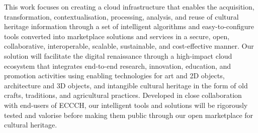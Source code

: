 This work focuses on creating a cloud infrastructure that enables the acquisition, transformation, contextualisation, processing, analysis, and reuse of cultural heritage information through a set of intelligent algorithms and easy-to-configure tools converted into marketplace solutions and services in a secure, open, collaborative, interoperable, scalable, sustainable, and cost-effective manner. Our solution will facilitate the digital renaissance through a high-impact cloud ecosystem that integrates end-to-end research, innovation, education, and promotion activities using enabling technologies for art and 2D objects, architecture and 3D objects, and intangible cultural heritage in the form of old crafts, traditions, and agricultural practices. Developed in close collaboration with end-users of ECCCH, our intelligent tools and solutions will be rigorously tested and valorise before making them public through our open marketplace for cultural heritage.
